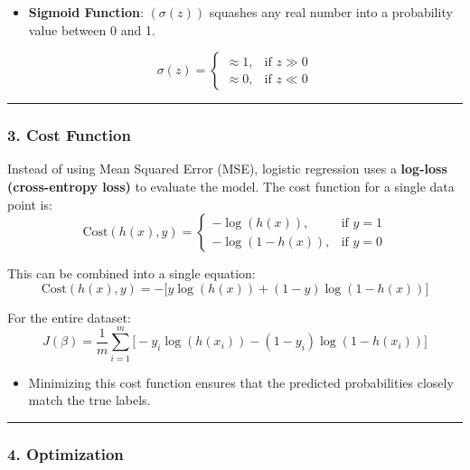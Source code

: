 \documentclass[12pt]{book}
\providecommand{\tightlist}{%
  \setlength{\itemsep}{0pt}\setlength{\parskip}{0pt}}
\begin{document}
\begin{itemize}
\tightlist
\item
  \textbf{Sigmoid Function}: \(( \sigma(z) )\) squashes any real number
  into a probability value between 0 and 1.
\end{itemize}

\[
\sigma(z) =
\begin{cases} 
\approx 1, & \text{if } z \gg 0 \\
\approx 0, & \text{if } z \ll 0
\end{cases}
\]

\begin{center}\rule{0.5\linewidth}{0.5pt}\end{center}

\subsubsection{\texorpdfstring{3. \textbf{Cost
Function}}{3. Cost Function}}\label{cost-function}

Instead of using Mean Squared Error (MSE), logistic regression uses a
\textbf{log-loss (cross-entropy loss)} to evaluate the model. The cost
function for a single data point is: \[
\text{Cost}(h(x), y) = 
\begin{cases} 
- \log(h(x)), & \text{if } y = 1 \\
- \log(1 - h(x)), & \text{if } y = 0
\end{cases}
\]

This can be combined into a single equation: \[
\text{Cost}(h(x), y) = - \big[ y \log(h(x)) + (1-y) \log(1 - h(x)) \big]
\]

For the entire dataset: \[
J(\beta) = \frac{1}{m} \sum_{i=1}^{m} \Big[- y_i \log(h(x_i)) - (1 - y_i) \log(1 - h(x_i))\Big]
\]

\begin{itemize}
\tightlist
\item
  Minimizing this cost function ensures that the predicted probabilities
  closely match the true labels.
\end{itemize}

\begin{center}\rule{0.5\linewidth}{0.5pt}\end{center}

\subsubsection{\texorpdfstring{4.
\textbf{Optimization}}{4. Optimization}}\label{optimization}
\end{document}

